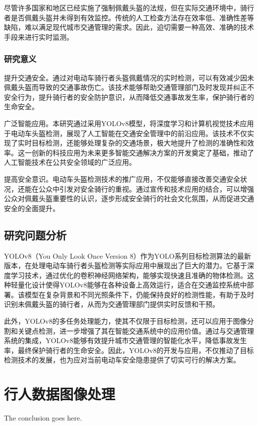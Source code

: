 \documentclass[journal]{IEEEtran}
\numberwithin{figure}{section}%
\begin{document}
尽管许多国家和地区已经实施了强制佩戴头盔的法规，但在实际交通环境中，骑行者是否佩戴头盔并未得到有效监控。传统的人工检查方法存在效率低、准确性差等缺陷，难以满足现代城市交通管理的需求。因此，迫切需要一种高效、准确的技术手段来进行实时监测。
\subsubsection{研究意义}

提升交通安全。通过对电动车骑行者头盔佩戴情况的实时检测，可以有效减少因未佩戴头盔而导致的交通事故伤亡。该技术能够帮助交通管理部门及时发现并纠正不安全行为，提升骑行者的安全防护意识，从而降低交通事故发生率，保护骑行者的生命安全。\par
广泛智能应用。本研究通过采用YOLOv8模型，将深度学习和计算机视觉技术应用于电动车头盔检测，展现了人工智能在交通安全管理中的前沿应用。该技术不仅实现了实时目标检测，还能够处理复杂的交通场景，极大地提升了检测的准确性和效率。这一创新的科技应用为未来更多智能交通解决方案的开发奠定了基础，推动了人工智能技术在公共安全领域的广泛应用。\par
提高安全意识。电动车头盔检测技术的推广应用，不仅能够直接改善交通安全状况，还能在公众中引发对安全骑行的重视。通过宣传和技术应用的结合，可以增强公众对佩戴头盔重要性的认识，逐步形成安全骑行的社会文化氛围，从而促进交通安全的全面提升。\par

\subsection{研究问题分析}
YOLOv8（You Only Look Once Version 8）作为YOLO系列目标检测算法的最新版本，在处理电动车骑行者头盔检测等实际应用中展现出了巨大的潜力。它基于深度学习技术，通过优化的卷积神经网络架构，能够实现快速且准确的物体检测。这种轻量化设计使得YOLOv8能够在各种设备上高效运行，适合在交通监控系统中部署。该模型在复杂背景和不同光照条件下，仍能保持良好的检测性能，有助于及时识别未佩戴头盔的骑行者，从而为交通管理部门提供实时反馈和干预。\par
此外，YOLOv8的多任务处理能力，使其不仅限于目标检测，还可以应用于图像分割和关键点检测，进一步增强了其在智能交通系统中的应用价值。通过与交通管理系统的集成，YOLOv8能够有效提升城市交通管理的智能化水平，降低事故发生率，最终保护骑行者的生命安全。因此，YOLOv8的开发与应用，不仅推动了目标检测技术的发展，也为应对当前电动车安全隐患提供了切实可行的解决方案。
\section{行人数据图像处理}
The conclusion goes here.
\end{document}
